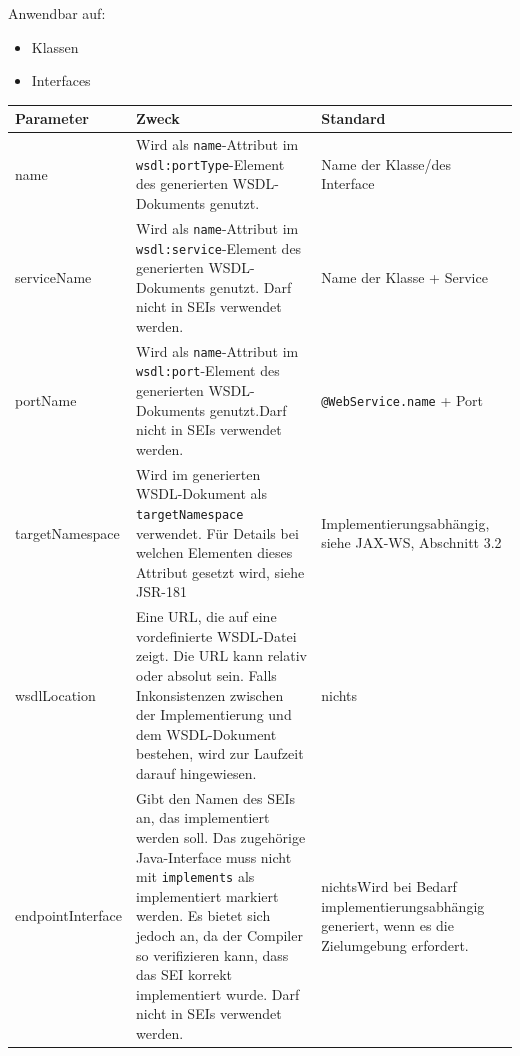 \documentclass[runningheads]{llncs}
\newcommand{\germanquote}[1]{\glqq{}#1\grqq{}}
\newcommand{\anntabwidth}{\textwidth}
\begin{document}
      \noindent{}Anwendbar auf:
      \begin{itemize}
       \item Klassen
       \item Interfaces\vfill
      \end{itemize}
    \begin{tabulary}{\anntabwidth}{|l|L|L|}
    \hline
    \textbf{Parameter} & \textbf{Zweck} & \textbf{Standard} \\
    \hline
      name &
      Wird als \texttt{name}-Attribut im \texttt{wsdl:portType}-Element des generierten
      WSDL-\linebreak[0]Dokuments genutzt. &
      Name der Klasse/\linebreak[0]des Interface \\
    \hline
      serviceName &
      Wird als \texttt{name}-Attribut im \texttt{wsdl:service}-Element des generierten
      WSDL-\linebreak[0]Dokuments genutzt. Darf nicht in SEIs verwendet werden. &
      Name der Klasse + \germanquote{Ser\-vice} \\
    \hline
      portName &
      Wird als \texttt{name}-Attribut im \texttt{wsdl:port}-Element des generierten
      WSDL-\linebreak[0]Dokuments genutzt.\newline Darf nicht in SEIs verwendet werden. &
      \texttt{@WebService.name} + \germanquote{Port} \\
    \hline
      targetNamespace &
      Wird im generierten WSDL-Dokument als \texttt{targetNamespace} verwendet. Für Details bei
      welchen Elementen dieses Attribut gesetzt wird, siehe JSR-181\cite{jsr_181} &
      Im\-ple\-men\-tier\-ungs\-ab\-häng\-ig, siehe JAX-WS\cite{jsr_224}, Abschnitt 3.2 \\
    \hline
      wsdlLocation &
      Eine URL, die auf eine vordefinierte WSDL-Datei zeigt. Die URL kann relativ oder absolut
      sein. Falls Inkonsistenzen zwischen der Implementierung und dem WSDL-Dokument bestehen, wird
      zur Laufzeit darauf hingewiesen. &
      nichts \\
    \hline
      endpointInterface &
      Gibt den Namen des SEIs an, das implementiert werden soll. Das zugehörige Java-Interface muss
      nicht mit \texttt{implements} als implementiert markiert werden. Es bietet sich jedoch an, da
      der Compiler so verifizieren kann, dass das SEI korrekt implementiert wurde.\newline\newline
      Darf nicht in SEIs verwendet werden. &
      nichts\newline \newline Wird bei Bedarf im\-ple\-men\-tier\-ungs\-ab\-häng\-ig generiert,
      wenn es die Zielumgebung erfordert. \\
    \hline
    \end{tabulary} \vfill
\end{document}
